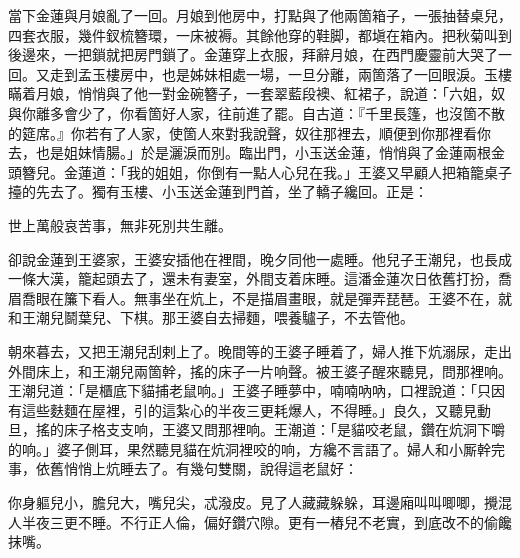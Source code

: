 當下金蓮與月娘亂了一回。月娘到他房中，打點與了他兩箇箱子，一張抽替桌兒，四套衣服，幾件釵梳簪環，一床被褥。其餘他穿的鞋脚，都塡在箱內。把秋菊叫到後邊來，一把鎖就把房門鎖了。{}金蓮穿上衣服，拜辭月娘，在西門慶靈前大哭了一回。{}又走到孟玉樓房中，也是姊妹相處一場，一旦分離，兩箇落了一回眼淚。玉樓瞞着月娘，悄悄與了他一對金碗簪子，一套翠藍段襖、紅裙子，說道：「六姐，奴與你離多會少了，你看箇好人家，往前進了罷。自古道：『千里長篷，也沒箇不散的筵席。』你若有了人家，使箇人來對我說聲，奴往那裡去，順便到你那裡看你去，也是姐妹情腸。」{}於是灑淚而別。臨出門，小玉送金蓮，悄悄與了金蓮兩根金頭簪兒。金蓮道：「我的姐姐，你倒有一點人心兒在我。」王婆又早顧人把箱籠桌子擡的先去了。獨有玉樓、小玉送金蓮到門首，坐了轎子纔回。正是：

\begin{myquote}
世上萬般哀苦事，無非死別共生離。
\end{myquote}

卻說金蓮到王婆家，王婆安插他在裡間，晚夕同他一處睡。他兒子王潮兒，也長成一條大漢，籠起頭去了，還未有妻室，外間支着床睡。這潘金蓮次日依舊打扮，喬眉喬眼在簾下看人。無事坐在炕上，不是描眉畫眼，就是彈弄琵琶。王婆不在，就和王潮兒鬬葉兒、下棋。那王婆自去掃麵，喂養驢子，不去管他。

朝來暮去，又把王潮兒刮剌上了。晚間等的王婆子睡着了，婦人推下炕溺尿，走出外間床上，和王潮兒兩箇幹，搖的床子一片响聲。{}被王婆子醒來聽見，問那裡响。王潮兒道：「是櫃底下貓捕老鼠响。」王婆子睡夢中，喃喃吶吶，口裡說道：「只因有這些麩麵在屋裡，引的這紮心的半夜三更耗爆人，不得睡。」良久，又聽見動旦，搖的床子格支支响，王婆又問那裡响。王潮道：「是貓咬老鼠，鑽在炕洞下嚼的响。」{}婆子側耳，果然聽見貓在炕洞裡咬的响，方纔不言語了。婦人和小厮幹完事，依舊悄悄上炕睡去了。有幾句雙關，說得這老鼠好：

\begin{myquote}
你身軀兒小，膽兒大，嘴兒尖，忒潑皮。見了人藏藏躲躲，耳邊廂叫叫唧唧，攪混人半夜三更不睡。不行正人倫，偏好鑽穴隙。更有一樁兒不老實，到底改不的偷饞抹嘴。
\end{myquote}

